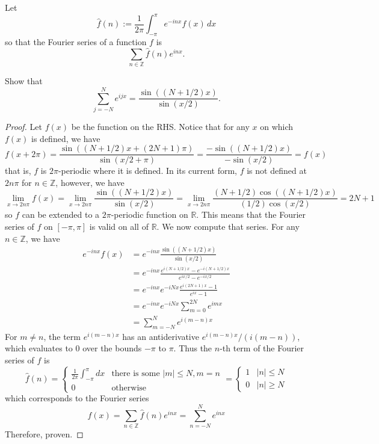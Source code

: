 \documentclass{article}
\newcommand{\Z}{\mathbb{Z}}
\newcommand{\R}{\mathbb{R}}
\theoremstyle{definition} %
\numberwithin{thm}{section} %
\theoremstyle{definition} %
\begin{document}
\section{}

Let
\[
\hat{f}(n) := \frac{1}{2\pi} \int_{-\pi}^{\pi} e^{-inx} f(x) \,dx
\]
so that the Fourier series of a function $f$ is
\[
\sum_{n \in \mathbb{Z}} \hat{f}(n) e^{inx}.
\]

    Show that
\[
\sum_{j=-N}^{N} e^{ijx} = \frac{\sin((N+1/2)x)}{\sin(x/2)}.
\]
\begin{proof}
Let $f(x)$ be the function on the RHS. Notice that for any $x$ on which
$f(x)$ is defined, we have
\[
    f(x + 2\pi) = \frac{\sin((N+1/2)x + (2N + 1)\pi)}{\sin(x/2 + \pi)} 
    = \frac{-\sin((N+1/2)x )}{-\sin(x/2)} = f(x)
\]
that is, $f$ is $2\pi$-periodic where it is defined. In its current form,
$f$ is not defined at $2n\pi$ for $n \in \Z$, however, we have
\[
    \lim_{x \to 2n\pi} f(x) = \lim_{x \to 2n\pi} 
    \frac{\sin((N+1/2)x)}{\sin(x/2)}
    = \lim_{x \to 2n\pi} 
    \frac{(N + 1/2)\cos((N+1/2)x)}{(1/2)\cos(x/2)}
    = 2N + 1
\]
so $f$ can be extended to a $2\pi$-periodic function on $\R$. 
This means that the Fourier series of $f$ on $[-\pi, \pi]$ is
valid on all of $\R$. We now compute that series. For any $n \in \Z$,
we have
\begin{align*}
    e^{-inx}f(x)
    &= e^{-inx}\frac{\sin((N+1/2)x)}{\sin(x/2)} \\
    &= e^{-inx}\frac{e^{i(N+1/2)x} - e^{-i(N+1/2)x}}
    {e^{ix/2} - e^{-ix/2}} \\
    &= e^{-inx}e^{-iNx}\frac{e^{i(2N + 1)x} - 1}{e^{ix} - 1} \\
    &= e^{-inx}e^{-iNx}\sum_{m = 0}^{2N} e^{imx} \\
    &= \sum_{m = -N}^{N} e^{i(m - n)x}
\end{align*}
For $m \neq n$, the term $e^{i(m - n)x}$ has an antiderivative 
$e^{i(m - n)x}/(i(m - n))$, which evaluates to 0 over the bounds
$-\pi$ to $\pi$. Thus the $n$-th term of the Fourier series of $f$ is
\[
    \hat{f}(n) = \begin{cases}
        \frac{1}{2\pi}\int_{-\pi}^\pi dx & 
        \text{there is some } |m| \leq N, m = n \\
        0 & \text{otherwise}
    \end{cases} = \begin{cases}
        1 & |n| \leq N \\
        0 & |n| \geq N
    \end{cases}
\]
which corresponds to the Fourier series
\[
    f(x) = \sum_{n \in \Z} \hat{f}(n)e^{inx} = \sum_{n = -N}^N e^{inx}  
\]
Therefore, proven.
\end{proof}
\end{document}
